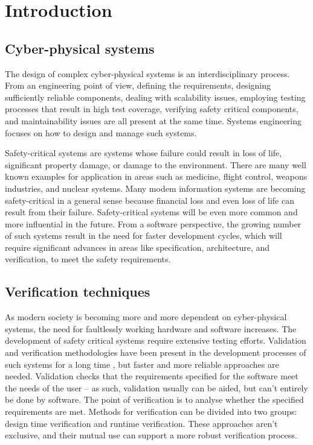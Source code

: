 \chapter{Introduction}
\label{chap:intro}

\section{Cyber-physical systems}

The design of complex cyber-physical systems is an interdisciplinary process. From an engineering point of view, defining the requirements, designing sufficiently reliable components, dealing with scalability issues, employing testing processes that result in high test coverage, verifying safety critical components, and maintainability issues are all present at the same time. Systems engineering focuses on how to design and manage such systems. \cite{randomwikipedialink1}

Safety-critical systems are systems whose failure could result in loss of life, significant property damage, or damage to the environment. There are many well known examples for application in areas such as medicine, flight control, weapons industries, and nuclear systems. Many modem information systems are becoming safety-critical in a general sense because financial loss and even loss of life can result from their failure. Safety-critical systems will be even more common and more influential in the future. From a software perspective, the growing number of such systems result in the need for faster development cycles, which will require significant advances in areas like specification, architecture, and verification, to meet the safety requirements. \cite{safetycritical}

\section{Verification techniques}

As modern society is becoming more and more dependent on cyber-physical systems, the need for faultlessly working hardware and software increases. The development of safety critical systems require extensive testing efforts. Validation and verification methodologies have been present in the development processes of such systems for a long time \citep{ieee1012}, but faster and more reliable approaches are needed. Validation checks that the requirements specified for the software meet the needs of the user -- as such, validation usually can be aided, but can’t entirely be done by software. The point of verification is to analyse whether the specified requirements are met. Methods for verification can be divided into two groups: design time verification and runtime verification. These approaches aren't exclusive, and their mutual use can support a more robust verification process.

